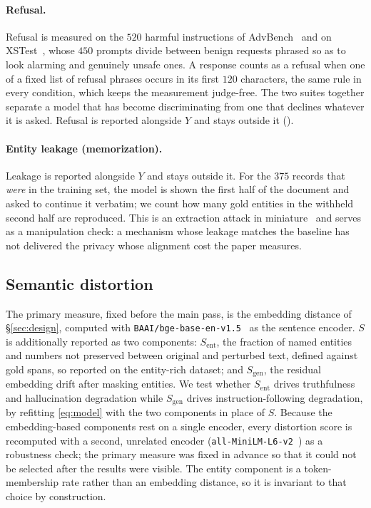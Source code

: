 \paragraph{Refusal.}
Refusal is measured on the $520$ harmful instructions of AdvBench~\citep{zou2023universal} and on XSTest~\citep{rottger2024xstest},
whose $450$ prompts divide between benign requests phrased so as to look alarming and genuinely unsafe ones.
A response counts as a refusal when one of a fixed list of refusal phrases occurs in its first $120$ characters,
the same rule in every condition,
which keeps the measurement judge-free.
The two suites together separate a model that has become discriminating from one that declines whatever it is asked.
Refusal is reported alongside $Y$ and stays outside it ().

\paragraph{Entity leakage (memorization).}
Leakage is reported alongside $Y$ and stays outside it.
For the $375$ records that \textit{were} in the training set,
the model is shown the first half of the document and asked to continue it verbatim;
we count how many gold entities in the withheld second half are reproduced.
This is an extraction attack in miniature~\citep{carlini2021extracting} and serves as a manipulation check:
a mechanism whose leakage matches the baseline has not delivered the privacy whose alignment cost the paper measures.

\subsection{Semantic distortion}
The primary measure,
fixed before the main pass,
is the embedding distance of \S\ref{sec:design},
computed with \texttt{BAAI/\allowbreak bge-base-\allowbreak en-v1.5}~\citep{xiao2024cpack} as the sentence encoder.
$S$ is additionally reported as two components:
$S_{\mathrm{ent}}$,
the fraction of named entities and numbers not preserved between original and perturbed text,
defined against gold spans,
so reported on the entity-rich dataset;
and $S_{\mathrm{gen}}$,
the residual embedding drift after masking entities.
We test whether $S_{\mathrm{ent}}$ drives truthfulness and hallucination degradation while $S_{\mathrm{gen}}$ drives instruction-following degradation,
by refitting \eqref{eq:model} with the two components in place of $S$. Because the embedding-based components rest on a single encoder,
every distortion score is recomputed with a second,
unrelated encoder (\texttt{all-\allowbreak MiniLM-\allowbreak L6-v2}~\citep{wang2020minilm, reimers2019sbert}) as a robustness check;
the primary measure was fixed in advance so that it could not be selected after the results were visible.
The entity component is a token-membership rate rather than an embedding distance,
so it is invariant to that choice by construction.

